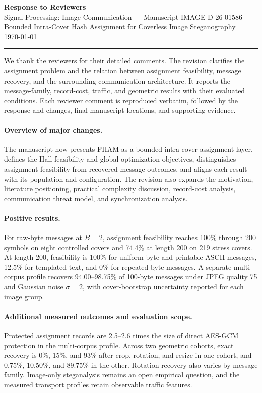 \documentclass[12pt,a4paper]{article}
\begin{document}
\begin{center}
{\Large\bfseries Response to Reviewers}\\[0.5em]
{\large Signal Processing: Image Communication --- Manuscript IMAGE-D-26-01586}\\[0.3em]
{\large Bounded Intra-Cover Hash Assignment for Coverless Image Steganography}\\[0.3em]
{\normalsize \today}
\end{center}
\hrule\vspace{1em}
We thank the reviewers for their detailed comments. The revision clarifies the assignment problem and the relation between assignment feasibility, message recovery, and the surrounding communication architecture. It reports the message-family, record-cost, traffic, and geometric results with their evaluated conditions. Each reviewer comment is reproduced verbatim, followed by the response and changes, final manuscript locations, and supporting evidence.

\paragraph{Overview of major changes.}
The manuscript now presents FHAM as a bounded intra-cover assignment layer, defines the Hall-feasibility and global-optimization objectives, distinguishes assignment feasibility from recovered-message outcomes, and aligns each result with its population and configuration. The revision also expands the motivation, literature positioning, practical complexity discussion, record-cost analysis, communication threat model, and synchronization analysis.

\paragraph{Positive results.}
For raw-byte messages at $B=2$, assignment feasibility reaches 100\% through 200 symbols on eight controlled covers and 74.4\% at length 200 on 219 stress covers. At length 200, feasibility is 100\% for uniform-byte and printable-ASCII messages, 12.5\% for templated text, and 0\% for repeated-byte messages. A separate multi-corpus profile recovers 94.00--98.75\% of 100-byte messages under JPEG quality 75 and Gaussian noise $\sigma=2$, with cover-bootstrap uncertainty reported for each image group.

\paragraph{Additional measured outcomes and evaluation scope.}
Protected assignment records are 2.5--2.6 times the size of direct AES-GCM protection in the multi-corpus profile. Across two geometric cohorts, exact recovery is 0\%, 15\%, and 93\% after crop, rotation, and resize in one cohort, and 0.75\%, 10.50\%, and 89.75\% in the other. Rotation recovery also varies by message family. Image-only steganalysis remains an open empirical question, and the measured transport profiles retain observable traffic features.
\end{document}

